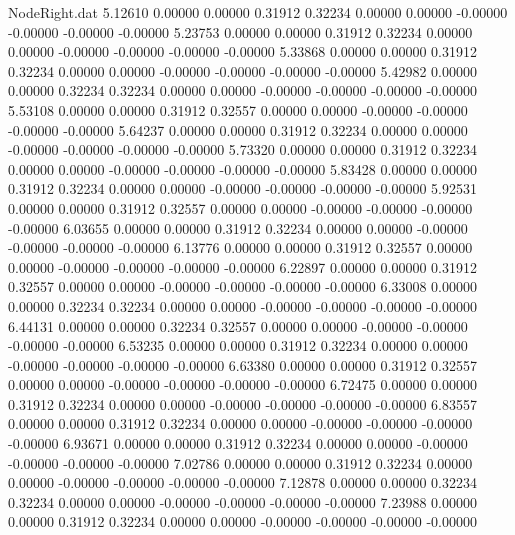 \begin{filecontents}{NodeRight.dat}
   5.12610    0.00000    0.00000     0.31912    0.32234    0.00000    0.00000   -0.00000   -0.00000   -0.00000   -0.00000
   5.23753    0.00000    0.00000     0.31912    0.32234    0.00000    0.00000   -0.00000   -0.00000   -0.00000   -0.00000
   5.33868    0.00000    0.00000     0.31912    0.32234    0.00000    0.00000   -0.00000   -0.00000   -0.00000   -0.00000
   5.42982    0.00000    0.00000     0.32234    0.32234    0.00000    0.00000   -0.00000   -0.00000   -0.00000   -0.00000
   5.53108    0.00000    0.00000     0.31912    0.32557    0.00000    0.00000   -0.00000   -0.00000   -0.00000   -0.00000
   5.64237    0.00000    0.00000     0.31912    0.32234    0.00000    0.00000   -0.00000   -0.00000   -0.00000   -0.00000
   5.73320    0.00000    0.00000     0.31912    0.32234    0.00000    0.00000   -0.00000   -0.00000   -0.00000   -0.00000
   5.83428    0.00000    0.00000     0.31912    0.32234    0.00000    0.00000   -0.00000   -0.00000   -0.00000   -0.00000
   5.92531    0.00000    0.00000     0.31912    0.32557    0.00000    0.00000   -0.00000   -0.00000   -0.00000   -0.00000
   6.03655    0.00000    0.00000     0.31912    0.32234    0.00000    0.00000   -0.00000   -0.00000   -0.00000   -0.00000
   6.13776    0.00000    0.00000     0.31912    0.32557    0.00000    0.00000   -0.00000   -0.00000   -0.00000   -0.00000
   6.22897    0.00000    0.00000     0.31912    0.32557    0.00000    0.00000   -0.00000   -0.00000   -0.00000   -0.00000
   6.33008    0.00000    0.00000     0.32234    0.32234    0.00000    0.00000   -0.00000   -0.00000   -0.00000   -0.00000
   6.44131    0.00000    0.00000     0.32234    0.32557    0.00000    0.00000   -0.00000   -0.00000   -0.00000   -0.00000
   6.53235    0.00000    0.00000     0.31912    0.32234    0.00000    0.00000   -0.00000   -0.00000   -0.00000   -0.00000
   6.63380    0.00000    0.00000     0.31912    0.32557    0.00000    0.00000   -0.00000   -0.00000   -0.00000   -0.00000
   6.72475    0.00000    0.00000     0.31912    0.32234    0.00000    0.00000   -0.00000   -0.00000   -0.00000   -0.00000
   6.83557    0.00000    0.00000     0.31912    0.32234    0.00000    0.00000   -0.00000   -0.00000   -0.00000   -0.00000
   6.93671    0.00000    0.00000     0.31912    0.32234    0.00000    0.00000   -0.00000   -0.00000   -0.00000   -0.00000
   7.02786    0.00000    0.00000     0.31912    0.32234    0.00000    0.00000   -0.00000   -0.00000   -0.00000   -0.00000
   7.12878    0.00000    0.00000     0.32234    0.32234    0.00000    0.00000   -0.00000   -0.00000   -0.00000   -0.00000
   7.23988    0.00000    0.00000     0.31912    0.32234    0.00000    0.00000   -0.00000   -0.00000   -0.00000   -0.00000

\end{filecontents}
